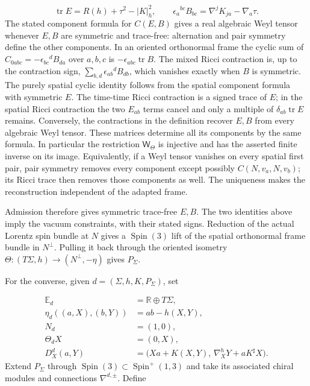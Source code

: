 \documentclass[
  english,
  11pt,
  reqno]{amsart}
\begin{document}
\label{eq:online-intrinsic-four-constraints} \[
\operatorname{tr}E=R(h)+\tau^2-|K|_h^2,\qquad
\epsilon_a{}^{bc}B_{bc}
=\nabla^jK_{ja}-\nabla_a\tau.
\] The stated component formula for \(C(E,B)\) gives a real algebraic
Weyl tensor whenever \(E,B\) are symmetric and trace-free: alternation
and pair symmetry define the other components. In an oriented
orthonormal frame the cyclic sum of
\(C_{0abc}=-\epsilon_{bc}{}^d B_{da}\) over \(a,b,c\) is
\(-\epsilon_{abc}\operatorname{tr}B\). The mixed Ricci contraction is,
up to the contraction sign, \(\sum_{b,d}\epsilon_{ab}{}^d B_{db}\),
which vanishes exactly when \(B\) is symmetric. The purely spatial
cyclic identity follows from the spatial component formula with
symmetric \(E\). The time-time Ricci contraction is a signed trace of
\(E\); in the spatial Ricci contraction the two \(E_{ab}\) terms cancel
and only a multiple of \(\delta_{ab}\operatorname{tr}E\) remains.
Conversely, the contractions in the definition recover \(E,B\) from
every algebraic Weyl tensor. These matrices determine all its components
by the same formula. In particular the restriction \(\mathsf W_\Theta\)
is injective and has the asserted finite inverse on its image.
Equivalently, if a Weyl tensor vanishes on every spatial first pair,
pair symmetry removes every component except possibly
\(C(N,v_a,N,v_b)\); its Ricci trace then removes those components as
well. The uniqueness makes the reconstruction independent of the adapted
frame.

Admission therefore gives symmetric trace-free \(E,B\). The two
identities above imply the vacuum constraints, with their stated signs.
Reduction of the actual Lorentz spin bundle at \(N\) gives a
\(\operatorname{Spin}(3)\) lift of the spatial orthonormal frame bundle
in \(N^\perp\). Pulling it back through the oriented isometry
\(\Theta:(T\Sigma,h)\to(N^\perp,-\eta)\) gives \(P_\Sigma\).

For the converse, given \(d=(\Sigma,h,K,P_\Sigma)\), set

\label{eq:online-intrinsic-constructor-connection} \[
\begin{aligned}
\mathbb E_d&=\mathbb R\oplus T\Sigma, \\
\eta_d((a,X),(b,Y))&=ab-h(X,Y), \\
N_d&=(1,0), \\
\Theta_dX&=(0,X), \\
D_X^d(a,Y)&=\bigl(Xa+K(X,Y),\,
                    \nabla_X^hY+aK^\sharp X\bigr).
\end{aligned}
\] Extend \(P_\Sigma\) through
\(\operatorname{Spin}(3)\subset\operatorname{Spin}^{+}(1,3)\) and take
its associated chiral modules and connections \(\nabla^{d,\pm}\). Define
\end{document}
